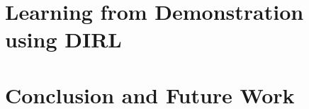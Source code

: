 \documentclass[hidelinks, 12pt]{cmuthesis}
\begin{document}
\chapter{Learning from Demonstration using DIRL} \label{chap:dirl}


\chapter{Conclusion and Future Work} \label{chap:conclusion}


%

\backmatter


\renewcommand{\bibsection}{\chapter{\bibname}}
% 

\nocite{*}
\end{document}
